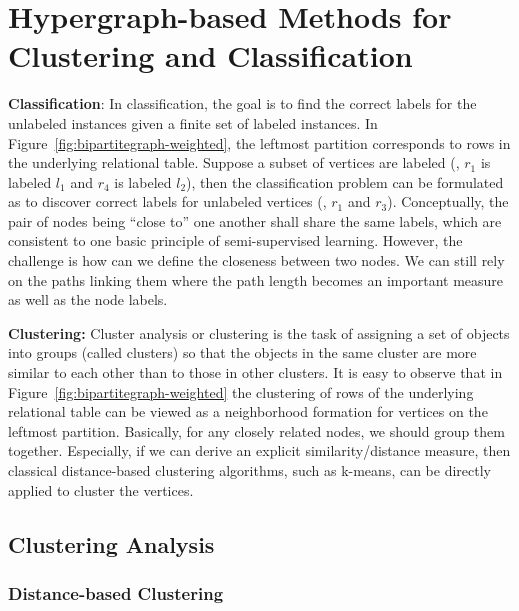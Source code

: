 \section{Hypergraph-based Methods for Clustering and Classification}

\textbf{Classification}:
In classification, the goal is to find the correct labels for the unlabeled instances given a finite set of labeled instances. In Figure~\ref{fig:bipartitegraph-weighted}, the leftmost partition corresponds to rows in the underlying relational table. Suppose a subset of vertices are labeled (\eg, $r_1$ is labeled $l_1$ and $r_4$ is labeled $l_2$), then the classification problem can be formulated as to discover correct labels for unlabeled vertices (\eg, $r_1$ and $r_3$). Conceptually, the pair of nodes being ``close to'' one another shall share the same labels, which are consistent to one basic principle of  semi-supervised learning. However, the challenge is how can we define the closeness between two nodes. We can still rely on the paths linking them where the path length becomes an important measure as well as the node labels.

\textbf{Clustering:}
Cluster analysis or clustering is the task of assigning a set of objects into groups (called clusters) so that the objects in the same cluster are more similar to each other than to those in other clusters. It is easy to observe that in Figure~\ref{fig:bipartitegraph-weighted}  the clustering of rows of the underlying relational table can be viewed as a neighborhood formation for vertices on the leftmost partition. Basically, for any closely related nodes, we should group them together. Especially, if we can derive an explicit  similarity/distance measure, then classical distance-based clustering algorithms, such as k-means, can be directly applied to cluster the vertices.

\subsection{Clustering Analysis}
\subsubsection{Distance-based Clustering}

